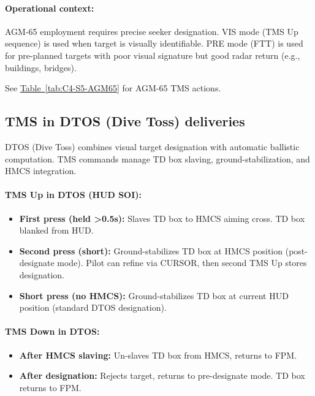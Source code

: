 \documentclass[11pt, a4paper, twoside]{report}
\newcommand{\tabref}[1]{\hyperref[#1]{Table~\ref*{#1}}}
\begin{document}
\paragraph{Operational context:}
AGM-65 employment requires precise seeker designation. VIS mode (TMS Up sequence) is used when target is visually identifiable. PRE mode (FTT) is used for pre-planned targets with poor visual signature but good radar return (e.g., buildings, bridges).

See \tabref{tab:C4-S5-AGM65} for AGM-65 TMS actions.

\subsection{TMS in DTOS (Dive Toss) deliveries}
\label{sec:C4-S5-S2}

DTOS (Dive Toss) combines visual target designation with automatic ballistic computation. TMS commands manage TD box slaving, ground-stabilization, and HMCS integration.

\paragraph{TMS Up in DTOS (HUD SOI):}
\begin{itemize}
    \item \textbf{First press (held >0.5s):} Slaves TD box to HMCS aiming cross. TD box blanked from HUD.
    \item \textbf{Second press (short):} Ground-stabilizes TD box at HMCS position (post-designate mode). Pilot can refine via CURSOR, then second TMS Up stores designation.
    \item \textbf{Short press (no HMCS):} Ground-stabilizes TD box at current HUD position (standard DTOS designation).
\end{itemize}

\paragraph{TMS Down in DTOS:}
\begin{itemize}
    \item \textbf{After HMCS slaving:} Un-slaves TD box from HMCS, returns to FPM.
    \item \textbf{After designation:} Rejects target, returns to pre-designate mode. TD box returns to FPM.
\end{itemize}
\end{document}
